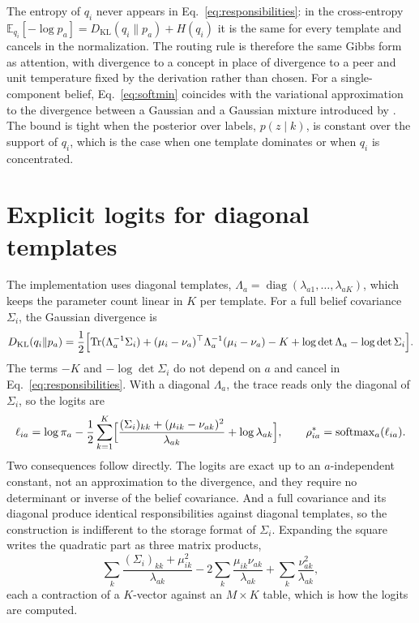 \documentclass[11pt]{article}
\theoremstyle{definition}
\theoremstyle{remark}
\newcommand{\KL}{D_{\mathrm{KL}}}
\newcommand{\softmax}{\operatorname{softmax}}
\newcommand{\Tr}{\operatorname{Tr}}
\newcommand{\diag}{\operatorname{diag}}
\newcommand{\E}{\mathbb{E}}
\begin{document}
The entropy of $q_i$ never appears in Eq.~\eqref{eq:responsibilities}: in the cross-entropy $\E_{q_i}[-\log p_a]=\KL(q_i\|p_a)+H(q_i)$ it is the same for every template and cancels in the normalization. The routing rule is therefore the same Gibbs form as attention, with divergence to a concept in place of divergence to a peer and unit temperature fixed by the derivation rather than chosen. For a single-component belief, Eq.~\eqref{eq:softmin} coincides with the variational approximation to the divergence between a Gaussian and a Gaussian mixture introduced by \citet{hershey2007}. The bound is tight when the posterior over labels, $p(z\mid k)$, is constant over the support of $q_i$, which is the case when one template dominates or when $q_i$ is concentrated.

\section{Explicit logits for diagonal templates}

The implementation uses diagonal templates, $\Lambda_a=\diag(\lambda_{a1},\dots,\lambda_{aK})$, which keeps the parameter count linear in $K$ per template. For a full belief covariance $\Sigma_i$, the Gaussian divergence is
\begin{equation}
\KL(q_i\|p_a)=\frac12\Bigl[\Tr(\Lambda_a^{-1}\Sigma_i)+(\mu_i-\nu_a)^{\top}\Lambda_a^{-1}(\mu_i-\nu_a)-K+\log\det\Lambda_a-\log\det\Sigma_i\Bigr].
\label{eq:gaussian_kl}
\end{equation}
The terms $-K$ and $-\log\det\Sigma_i$ do not depend on $a$ and cancel in Eq.~\eqref{eq:responsibilities}. With a diagonal $\Lambda_a$, the trace reads only the diagonal of $\Sigma_i$, so the logits are
\begin{equation}
\ell_{ia}=\log\pi_a-\frac12\sum_{k=1}^K\Bigl[\frac{(\Sigma_i)_{kk}+(\mu_{ik}-\nu_{ak})^2}{\lambda_{ak}}+\log\lambda_{ak}\Bigr],
\qquad
\rho^{*}_{ia}=\softmax_a(\ell_{ia}).
\label{eq:logits}
\end{equation}
Two consequences follow directly. The logits are exact up to an $a$-independent constant, not an approximation to the divergence, and they require no determinant or inverse of the belief covariance. And a full covariance and its diagonal produce identical responsibilities against diagonal templates, so the construction is indifferent to the storage format of $\Sigma_i$. Expanding the square writes the quadratic part as three matrix products,
\begin{equation}
\sum_k\frac{(\Sigma_i)_{kk}+\mu_{ik}^2}{\lambda_{ak}}
-2\sum_k\frac{\mu_{ik}\nu_{ak}}{\lambda_{ak}}
+\sum_k\frac{\nu_{ak}^2}{\lambda_{ak}},
\label{eq:matmul_form}
\end{equation}
each a contraction of a $K$-vector against an $M\times K$ table, which is how the logits are computed.
\end{document}
